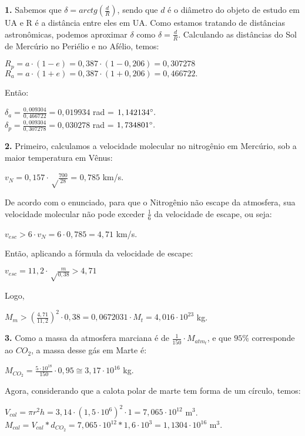 \documentclass[12pt,letterpaper]{article}
\begin{document}
	\part{}
		\textbf{1.} Sabemos que $\delta = arctg (\frac{d}{R})$, sendo que $d$ é o diâmetro do objeto de estudo em UA e R é a distância entre eles em UA. Como estamos tratando de distâncias astronômicas, podemos aproximar $\delta$ como $\delta = \frac{d}{R}$. Calculando as distâncias do Sol de Mercúrio no Periélio e no Afélio, temos: \\
		\begin{center}
		$R_p = a\cdot (1-e) = 0,387 \cdot (1-0,206) = 0,307278$ \\
		$R_a = a\cdot (1+e) = 0,387 \cdot (1+0,206) = 0,466722.$ 
		\end{center}
		Então:
		\begin{center}
		$\delta_a = \frac{0,009304}{0,466722} = 0,019934$ rad = $ 1,142134\degree.$ \\
		$\delta_p = \frac{0,009304}{0,307278} = 0,030278$ rad = $ 1,734801\degree.$
		\end{center} 
		
		\textbf{2.}  Primeiro, calculamos a velocidade molecular no nitrogênio em Mercúrio, sob a maior temperatura em Vênus: 
		\begin{center}
		$v_N = 0,157 \cdot \sqrt\frac{700}{28}$ = $0,785$ km/s.
		\end{center} 
	    De acordo com o enunciado, para que o Nitrogênio não escape da atmosfera, sua velocidade molecular não pode exceder $\frac{1}{6}$ da velocidade de escape, ou seja:
	    \begin{center}
	    $v_{esc} > 6 \cdot v_N = 6 \cdot 0,785 = 4,71$ km/s.
	    \end{center}
	    Então, aplicando a fórmula da velocidade de escape: 
	    \begin{center}
	    $v_{esc} = 11,2 \cdot \sqrt \frac{m}{0,38} > 4,71$
	    \end{center}  Logo, 
	    \begin{center}
	    $ M_m > (\frac{4,71}{11,2})^2 \cdot 0,38 = 0,0672031 \cdot M_t = 4,016 \cdot 10^{23}$ kg. 
	    \end{center}
	    
	    \textbf{3.} Como a massa da atmosfera marciana é de 
	    $\frac{1}{150} \cdot M_{atm_t}$, e que $95\%$ corresponde ao $CO_2$, a massa desse gás em Marte é:\\
	    \begin{center}
	    $M_{CO_2} = \frac{5\cdot10^{18}}{150} \cdot 0,95 \cong 3,17 \cdot 10^{16}$ kg. 
	    \end{center}
	    Agora, considerando que a calota polar de marte tem forma de um círculo, temos: 
	    \begin{center}
	    $V_{cal} = \pi r^2h = 3,14 \cdot (1,5 \cdot 10^{6})^2 \cdot 1 = 7,065 \cdot 10^{12}$ m$^3$. \\
	    $M_{cal} = V_{cal} * d_{CO_2} = 7,065 \cdot 10^{12} * 1,6 \cdot 10^3 = 1,1304 \cdot 10^{16}$ m$^3$. 
	    \end{center}
	    
\end{document}
